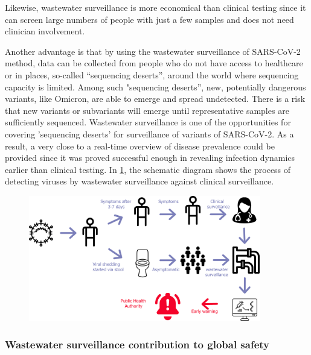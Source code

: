         Likewise, wastewater surveillance is more economical than clinical testing since it can screen large numbers of people with just a few samples and does not need clinician involvement.
        
        Another advantage is that by using the wastewater surveillance of SARS-CoV-2 method, data can be collected from people who do not have access to healthcare or in places, so-called “sequencing deserts”, around the world where sequencing capacity is limited. Among such "sequencing deserts'', new, potentially dangerous variants, like Omicron, are able to emerge and spread undetected. There is a risk that new variants or subvariants will emerge until representative samples are sufficiently sequenced. Wastewater surveillance is one of the opportunities for covering 'sequencing deserts' for surveillance of variants of SARS-CoV-2. As a result, a very close to a real-time overview of disease prevalence could be provided since it was proved \cite{zhang2021} successful enough in revealing infection dynamics earlier than clinical testing. In \cref{fig:intro:ww-process}, the schematic diagram shows the process of detecting viruses by wastewater surveillance against clinical surveillance. 
        \begin{figure}[ht!]
        	\centering
            \includegraphics[width=0.9\textwidth]{figures/intro/ww-process-v2.png}
            \label{fig:intro:ww-process}
        \end{figure}

        \subsubsection{Wastewater surveillance contribution to global safety} 
        
